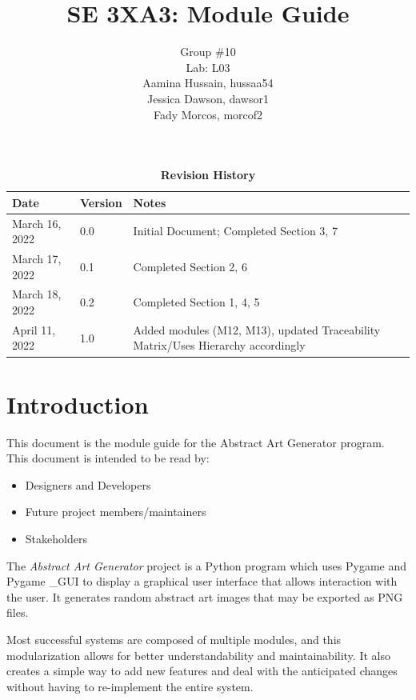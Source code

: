 \documentclass[12pt, titlepage]{article}
\title{SE 3XA3: Module Guide}
\author{Group \#10
        \\Lab: L03
		\\ Aamina Hussain, hussaa54
		\\ Jessica Dawson, dawsor1
		\\ Fady Morcos, morcof2
}
\date{}
\begin{document}
\maketitle

\tableofcontents
\listoftables
\listoffigures

\begin{table}[h!]
\caption{\bf Revision History}
\begin{tabularx}{\textwidth}{p{3cm}p{2cm}X}
\toprule {\bf Date} & {\bf Version} & {\bf Notes}\\
\midrule
March 16, 2022 & 0.0 & Initial Document; Completed Section 3, 7\\
March 17, 2022 & 0.1 & Completed Section 2, 6\\
March 18, 2022 & 0.2 & Completed Section 1, 4, 5\\
\color{red}April 11, 2022 & \color{red}1.0 & \color{red}Added modules (M12, M13), updated Traceability Matrix/Uses Hierarchy accordingly\\
\bottomrule
\end{tabularx}
\end{table}

\newpage


\section{Introduction}

This document is the module guide for the Abstract Art Generator program. This document is intended to be read by:

\begin{itemize}
  \item Designers and Developers
  \item Future project members/maintainers
  \item Stakeholders
\end{itemize}

The \emph{Abstract Art Generator} project is a Python program which uses Pygame and Pygame \_GUI to display a graphical user interface that allows interaction with the user. It generates random abstract art images that may be exported as PNG files. 

Most successful systems are composed of multiple modules, and this modularization allows for better understandability and maintainability. It also creates a simple way to add new features and deal with the anticipated changes without having to re-implement the entire system.
\end{document}
